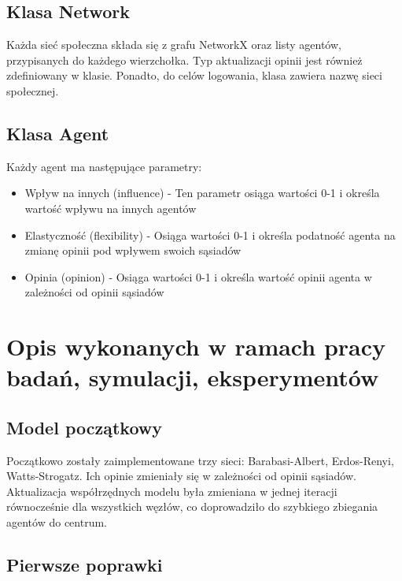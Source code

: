 \documentclass{wfiisul}
\begin{document}
\section{Klasa Network}

Każda sieć społeczna składa się z grafu NetworkX oraz listy agentów, przypisanych do każdego wierzchołka. 
Typ aktualizacji opinii jest również zdefiniowany w klasie. 
Ponadto, do celów logowania, klasa zawiera nazwę sieci społecznej. 

\section{Klasa Agent}

Każdy agent ma następujące parametry:
\begin{itemize}
  \item Wpływ na innych (influence) - Ten parametr osiąga wartości 0-1 i określa wartość wpływu na innych agentów
  \item Elastyczność (flexibility) - Osiąga wartości 0-1 i określa podatność agenta na zmianę opinii pod wpływem swoich sąsiadów
  \item Opinia (opinion) - Osiąga wartości 0-1 i określa wartość opinii agenta w zależności od opinii sąsiadów
\end{itemize}


\chapter{Opis wykonanych w ramach pracy badań, symulacji, eksperymentów}


\section{Model początkowy}

Początkowo zostały zaimplementowane trzy sieci: Barabasi-Albert, Erdos-Renyi, Watts-Strogatz. 
Ich opinie zmieniały się w zależności od opinii sąsiadów. 
Aktualizacja współrzędnych modelu była zmieniana w jednej iteracji równocześnie dla wszystkich węzłów, co doprowadziło do szybkiego zbiegania agentów do centrum. 

\section{Pierwsze poprawki}
\end{document}
